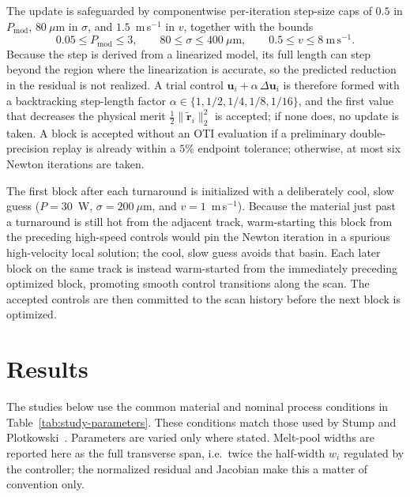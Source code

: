 \documentclass[11pt]{article}
\newcommand{\Pmod}{P_{\mathrm{mod}}}
\begin{document}
The update is safeguarded by componentwise per-iteration step-size caps of
$0.5$ in $\Pmod$, $80~\mu$m in $\sigma$, and $1.5$~m\,s$^{-1}$ in $v$, together
with the bounds
\begin{equation}
  0.05\leq\Pmod\leq3,
  \qquad 80\leq\sigma\leq400~\mu\mathrm{m},
  \qquad 0.5\leq v\leq8~\mathrm{m\,s^{-1}}.
\end{equation}
Because the step is derived from a linearized model, its full length can step
beyond the region where the linearization is accurate, so the predicted
reduction in the residual is not realized. A trial control
$\mathbf u_i+\alpha\,\Delta\mathbf u_i$ is therefore formed with a backtracking
step-length factor $\alpha\in\{1,1/2,1/4,1/8,1/16\}$, and the first value that
decreases the physical merit
$\tfrac12\lVert\widetilde{\mathbf r}_i\rVert_2^2$ is accepted; if none does, no
update is taken. A block is
accepted without an OTI evaluation if a preliminary double-precision replay
is already within a $5\%$ endpoint tolerance; otherwise, at most six Newton
iterations are taken.

The first block after each turnaround is initialized with a deliberately cool,
slow guess ($P=30$~W, $\sigma=200~\mu$m, and $v=1$~m\,s$^{-1}$). Because the
material just past a turnaround is still hot from the adjacent track,
warm-starting this block from the preceding high-speed controls would pin the
Newton iteration in a spurious high-velocity local solution; the cool, slow
guess avoids that basin. Each later block on the same track is instead
warm-started from the immediately preceding optimized block, promoting smooth
control transitions along the scan. The accepted controls are then committed to
the scan history before the next block is optimized.

\section{Results}
\label{sec:results}

The studies below use the common material and nominal process conditions in
Table~\ref{tab:study-parameters}. These conditions match those used by
Stump and Plotkowski~\cite{stump2019}. Parameters are varied only where stated.
Melt-pool widths are reported here as the full transverse span, i.e.\ twice the
half-width $w_i$ regulated by the controller; the normalized residual and
Jacobian make this a matter of convention only.
\end{document}
